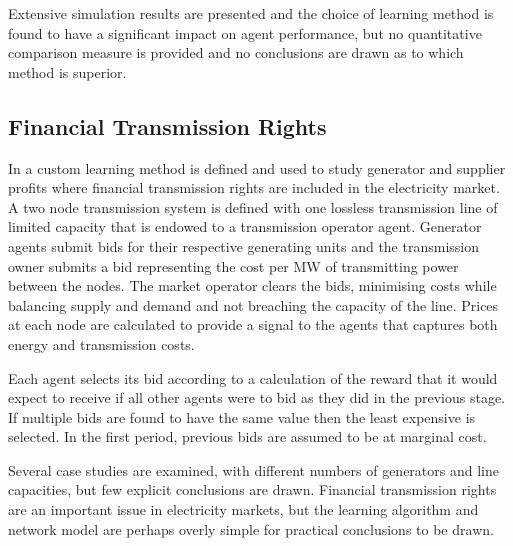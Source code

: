 Extensive simulation results are presented and the choice of learning method is
found to have a significant impact on agent performance, but no quantitative
comparison measure is provided and no conclusions are drawn as to which method
is superior.

\subsection{Financial Transmission Rights}
In  a custom learning method is defined and used to study
generator and supplier profits where financial transmission rights are included
in the electricity market.  A two node transmission system is defined with one
lossless transmission line of limited capacity that is endowed to a transmission
operator agent.  Generator agents submit bids for their respective generating
units and the transmission owner submits a bid representing the cost per MW of
transmitting power between the nodes.  The market operator clears the bids,
minimising costs while balancing supply and demand and not breaching the
capacity of the line.  Prices at each node are calculated to provide a signal to
the agents that captures both energy and transmission costs.


Each agent selects its bid according to a calculation of the reward that it
would expect to receive if all other agents were to bid as they did in the
previous stage.  If multiple bids are found to have the same value then the
least expensive is selected.  In the first period, previous bids are assumed to
be at marginal cost.

Several case studies are examined, with different numbers of generators and
line capacities, but few explicit conclusions are drawn.  Financial transmission
rights are an important issue in electricity markets, but the learning algorithm
and network model are perhaps overly simple for practical conclusions to be
drawn.



